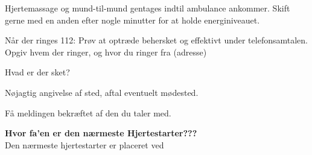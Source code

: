 \documentclass[../../../main.tex]{subfiles}
\begin{document}
Hjertemassage og mund-til-mund gentages indtil ambulance ankommer. Skift gerne med en anden efter nogle minutter for at holde energiniveauet. 


Når der ringes 112: Prøv at optræde behersket og effektivt under telefonsamtalen.
Opgiv hvem der ringer, og hvor du ringer fra (adresse)


Hvad er der sket?


Nøjagtig angivelse af sted, aftal eventuelt mødested.


Få meldingen bekræftet af den du taler med.


\textbf{Hvor fa'en er den nærmeste Hjertestarter???}\\
Den nærmeste hjertestarter er placeret ved \placeholder
\end{document}
